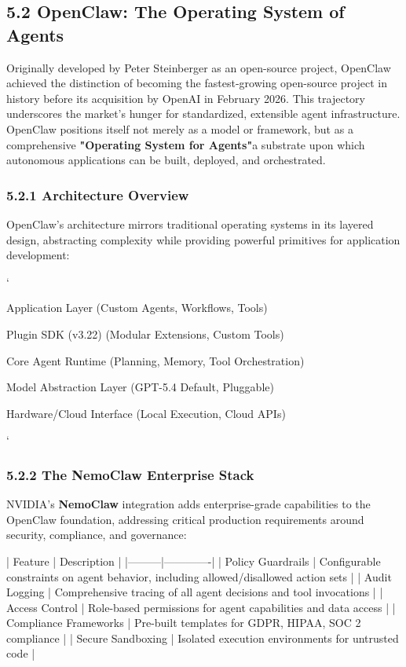 \subsection{5.2 OpenClaw: The Operating System of Agents}

Originally developed by Peter Steinberger as an open-source project, OpenClaw achieved the distinction of becoming the fastest-growing open-source project in history before its acquisition by OpenAI in February 2026. This trajectory underscores the market's hunger for standardized, extensible agent infrastructure. OpenClaw positions itself not merely as a model or framework, but as a comprehensive \textbf{"Operating System for Agents"}a substrate upon which autonomous applications can be built, deployed, and orchestrated.

\subsubsection{5.2.1 Architecture Overview}

OpenClaw's architecture mirrors traditional operating systems in its layered design, abstracting complexity while providing powerful primitives for application development:

\texttt{}`

         Application Layer               
    (Custom Agents, Workflows, Tools)    

         Plugin SDK (v3.22)              
  (Modular Extensions, Custom Tools)     

         Core Agent Runtime              
  (Planning, Memory, Tool Orchestration) 

         Model Abstraction Layer         
      (GPT-5.4 Default, Pluggable)       

         Hardware/Cloud Interface        
    (Local Execution, Cloud APIs)        

\texttt{}`

\subsubsection{5.2.2 The NemoClaw Enterprise Stack}

NVIDIA's \textbf{NemoClaw} integration adds enterprise-grade capabilities to the OpenClaw foundation, addressing critical production requirements around security, compliance, and governance:

| Feature | Description |
|---------|-------------|
| Policy Guardrails | Configurable constraints on agent behavior, including allowed/disallowed action sets |
| Audit Logging | Comprehensive tracing of all agent decisions and tool invocations |
| Access Control | Role-based permissions for agent capabilities and data access |
| Compliance Frameworks | Pre-built templates for GDPR, HIPAA, SOC 2 compliance |
| Secure Sandboxing | Isolated execution environments for untrusted code |

